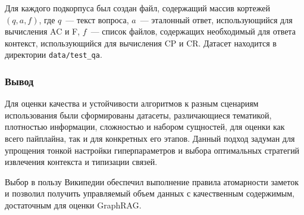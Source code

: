 Для каждого подкорпуса был создан файл, содержащий массив кортежей \((q, a, f)\),
где \(q\)~--- текст вопроса,
\(a\)~--- эталонный ответ, использующийся для вычисления AC и F,
\(f\)~--- список файлов, содержащих необходимый для ответа контекст,
использующийся для вычисления CP и CR.
Датасет находится в директории \texttt{data/test\_qa}.

\subsubsection*{Вывод}

Для оценки качества и устойчивости алгоритмов к разным сценариям использования были сформированы
датасеты, различающиеся тематикой, плотностью информации, сложностью и набором сущностей,
для оценки как всего пайплайна, так и для конкретных его этапов.
Данный подход задуман для упрощения тонкой настройки гиперпараметров и
выбора оптимальных стратегий извлечения контекста и типизации связей.

Выбор в пользу Википедии обеспечил выполнение правила атомарности заметок
и позволил получить управляемый объем данных с качественным содержимым, достаточным для оценки GraphRAG.
